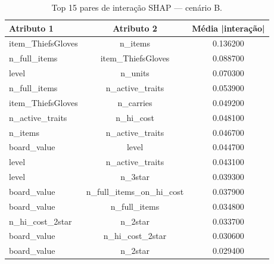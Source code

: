 \begin{table}[htbp]
\caption{Top 15 pares de interação SHAP — cenário B.}
\label{tab:intertB}
\centering
\small
\begin{tabular}{lcc}
\toprule
Atributo 1 & Atributo 2 & Média |interação| \\
\midrule
item\_ThiefsGloves & n\_items & 0.136200 \\
n\_full\_items & item\_ThiefsGloves & 0.088700 \\
level & n\_units & 0.070300 \\
n\_full\_items & n\_active\_traits & 0.053900 \\
item\_ThiefsGloves & n\_carries & 0.049200 \\
n\_active\_traits & n\_hi\_cost & 0.048100 \\
n\_items & n\_active\_traits & 0.046700 \\
board\_value & level & 0.044700 \\
level & n\_active\_traits & 0.043100 \\
level & n\_3star & 0.039300 \\
board\_value & n\_full\_items\_on\_hi\_cost & 0.037900 \\
board\_value & n\_full\_items & 0.034800 \\
n\_hi\_cost\_2star & n\_2star & 0.033700 \\
board\_value & n\_hi\_cost\_2star & 0.030600 \\
board\_value & n\_2star & 0.029400 \\
\bottomrule
\end{tabular}
\end{table}
